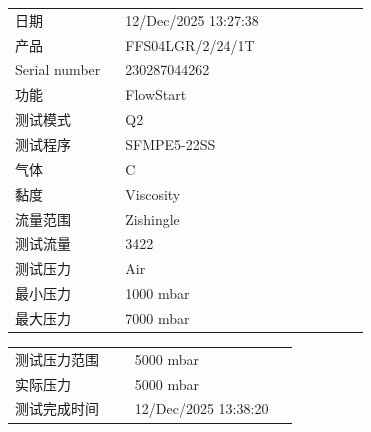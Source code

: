 \documentclass[UTF8,10pt,a4paper,fontset=fandol]{ctexart}
\newcommand{\fieldvalue}[1]{#1}
\begin{document}
\begin{tabular}{@{}p{0.28\linewidth}p{0.62\linewidth}@{}}
日期 &
\fieldvalue{12/Dec/2025 13:27:38}
\\[2pt]
产品 &
\fieldvalue{FFS04LGR/2/24/1T}
\\[2pt]
Serial number &
\fieldvalue{230287044262}
\\[2pt]
功能 &
\fieldvalue{FlowStart}
\\[2pt]
测试模式 &
\fieldvalue{Q2}
\\[2pt]
测试程序 &
\fieldvalue{SFMPE5-22SS}
\\[2pt]
气体 &
\fieldvalue{C}
\\[2pt]
黏度 &
\fieldvalue{Viscosity}
\\[2pt]
流量范围 &
\fieldvalue{Zishingle}
\\[2pt]
测试流量 &
\fieldvalue{3422}
\\[2pt]
测试压力 &
\fieldvalue{Air}
\\[2pt]
最小压力 &
\fieldvalue{1000 mbar}
\\[2pt]
最大压力 &
\fieldvalue{7000 mbar}
\end{tabular}

\vspace{0.5em}

\begin{tabular}{@{}p{0.38\linewidth}p{0.52\linewidth}@{}}
测试压力范围 &
\fieldvalue{5000 mbar}
\\[2pt]
实际压力 &
\fieldvalue{5000 mbar}
\\[2pt]
测试完成时间 &
\fieldvalue{12/Dec/2025 13:38:20}
\end{tabular}

\vspace{1em}
\end{document}
